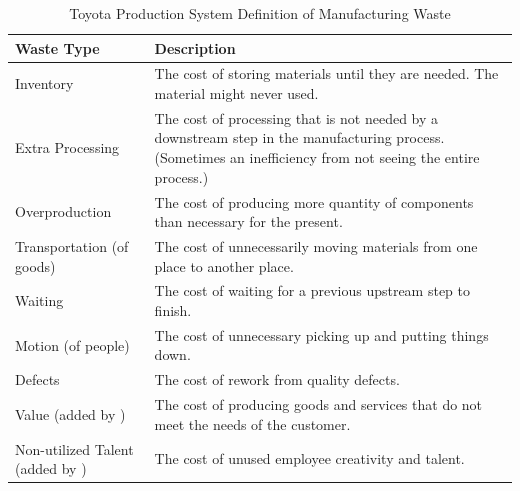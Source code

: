 \begin{table}[t]
\renewcommand{\arraystretch}{1.5}
\centering
\caption{Toyota Production System Definition of Manufacturing Waste}
\label{ManufacturingWaste}
\begin{tabular}{| >{\raggedright}m{1.15in}|p{2.00in}|}
\hline
Waste Type                & Description                                                                                                                                                  \\ \hline
Inventory                 & The cost of storing materials until they are needed. The material might never used.                                                                   \\ \hline
Extra Processing          & The cost of processing that is not needed by a downstream step in the manufacturing process. (Sometimes an inefficiency from not seeing the entire process.) \\ \hline
Overproduction            & The cost of producing more quantity of components than necessary for the present.                                                                            \\ \hline
Transportation (of goods) & The cost of unnecessarily moving materials from one place to another place.                                                                                  \\ \hline
Waiting                   & The cost of waiting for a previous upstream step to finish.                                                                                                       \\ \hline
Motion (of people)        & The cost of unnecessary picking up and putting things down.                                                                                                  \\ \hline
Defects                   & The cost of rework from quality defects.                                                                                                                     \\ \hline
Value (added by \cite{WomackLeanThinking})                     & The cost of producing goods and services that do not meet the needs of the customer.                                                                         \\ \hline
Non-utilized Talent (added by \cite{ LikerToyotaWay})      & The cost of unused employee creativity and talent.                                                                                                           \\ \hline
\end{tabular}
\end{table}


